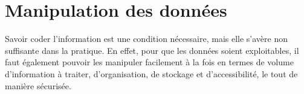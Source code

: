 




\vfill\pagebreak


\section[Manipulation des données]{Manipulation des données}
\label{sec:V.3}

Savoir coder l'information est une condition nécessaire, mais elle s'avère non suffisante dans la pratique. En effet, pour que les données soient exploitables, il faut également pouvoir les manipuler facilement à la fois en termes de volume d'information à traiter, d'organisation, de stockage et d'accessibilité, le tout de manière sécurisée.

